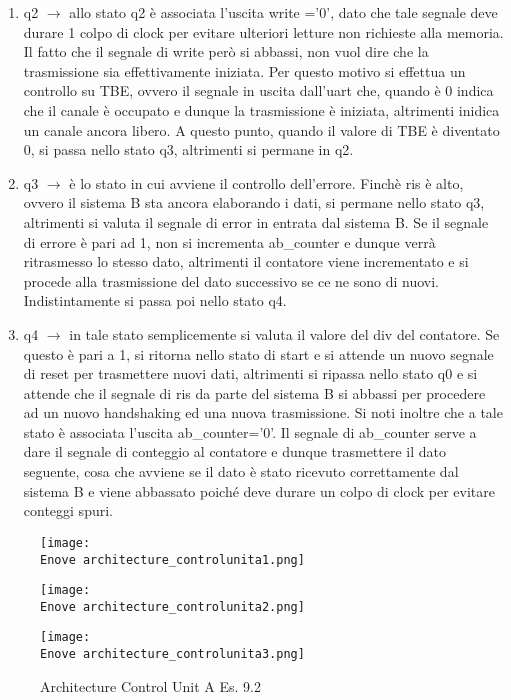 \documentclass[12pt]{article}
\def \Enove {Allegati/Esercizio9/}
\begin{document}
\begin{enumerate}
    \item q2 $\rightarrow$ allo stato q2 è associata l’uscita write =’0’, dato che tale segnale deve durare 1 colpo di clock per evitare ulteriori letture non richieste alla memoria. Il fatto che il segnale di write però si abbassi, non vuol dire che la trasmissione sia effettivamente iniziata. Per questo motivo si effettua un controllo su TBE, ovvero il segnale in uscita dall’uart che, quando è 0 indica che il canale è occupato e dunque la trasmissione è iniziata, altrimenti inidica un canale ancora libero.
          A questo punto, quando il valore di TBE è diventato 0, si passa nello stato q3, altrimenti si permane in q2.
    \item q3 $\rightarrow$ è lo stato in cui avviene il controllo dell’errore. Finchè ris è alto, ovvero il sistema B sta ancora elaborando i dati, si permane nello stato q3, altrimenti si valuta il segnale di error in entrata dal sistema B. Se il segnale di errore è pari ad 1, non si incrementa ab\_counter e dunque verrà ritrasmesso lo stesso dato, altrimenti il contatore viene incrementato e si procede alla trasmissione del dato successivo se ce ne sono di nuovi. Indistintamente si passa poi nello stato q4.
    \item q4 $\rightarrow$ in tale stato semplicemente si valuta il valore del div del contatore. Se questo è pari a 1, si ritorna nello stato di start e si attende un nuovo segnale di reset per trasmettere nuovi dati, altrimenti si ripassa nello stato q0 e si attende che il segnale di ris da parte del sistema B si abbassi per procedere ad un nuovo handshaking ed una nuova trasmissione.
          Si noti inoltre che a tale stato è associata l’uscita ab\_counter=’0’. Il segnale di ab\_counter serve a dare il segnale di conteggio al contatore e dunque trasmettere il dato seguente, cosa che avviene se il dato è stato ricevuto correttamente dal sistema B e viene abbassato poiché deve durare un colpo di clock per evitare conteggi spuri.
\end{enumerate}
\begin{figure}[ht!]
    \texttt{[image: \\Enove architecture\_controlunita1.png]}
\end{figure}
\clearpage
\begin{figure}[ht!]
    \centering
    \texttt{[image: \\Enove architecture\_controlunita2.png]}
\end{figure}
\begin{figure}[ht!]
    \texttt{[image: \\Enove architecture\_controlunita3.png]}
    \caption{Architecture Control Unit A Es. 9.2}
\end{figure}
\end{document}
